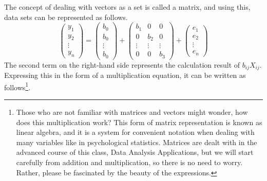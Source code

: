 \documentclass{ltjbook}
\begin{document}
The concept of dealing with vectors as a set is called a matrix, and using this, data sets can be represented as follows.
\[
	\begin{pmatrix} y_1 \\ y_2 \\ \vdots \\ y_n \end{pmatrix}
	=
	\begin{pmatrix} b_0 \\ b_0 \\ \vdots \\ b_0 \end{pmatrix}
	+
	\begin{pmatrix} b_1 & 0 & 0 \\ 0 & b_2 & 0 \\ \vdots &\vdots & \vdots\\ 0 & 0 & b_3 \end{pmatrix}
	+
	\begin{pmatrix} e_1 \\ e_2 \\ \vdots \\ e_n \end{pmatrix}
\]
The second term on the right-hand side represents the calculation result of $b_{ij}X_{ij}$. Expressing this in the form of a multiplication equation, it can be written as follows\footnote{Those who are not familiar with matrices and vectors might wonder, how does this multiplication work? This form of matrix representation is known as linear algebra, and it is a system for convenient notation when dealing with many variables like in psychological statistics. Matrices are dealt with in the advanced course of this class, Data Analysis Applications, but we will start carefully from addition and multiplication, so there is no need to worry. Rather, please be fascinated by the beauty of the expressions.}.
\end{document}
